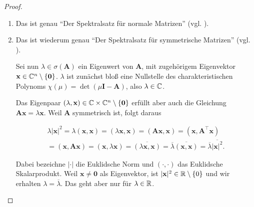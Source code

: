            \begin{proof}

                \phantom{}

                \begin{enumerate}[
                    label = \texttt{ad} \arabic*.,
                    wide,
                    labelindent = 0pt
                ]

                    \item Das ist genau \enquote{Der Spektralsatz für normale Matrizen} (vgl. \cite[Kapitel 17.7]{brokate2015grundwissen}).

                    \item Das ist wiederum genau \enquote{Der Spektralsatz für symmetrische Matrizen} (vgl. \cite[Kapitel 17.7]{brokate2015grundwissen}).

                    Sei nun $\lambda \in \sigma(\mathbf A)$ ein Eigenwert von $\mathbf A$, mit zugehörigem Eigenvektor $\mathbf x \in \mathbb C^n \setminus {\left \{ \mathbf 0 \right \}}$.
                    $\lambda$ ist zunächst bloß eine Nullstelle des charakteristischen Polynoms $\chi(\mu) = \det(\mu \mathbf I - \mathbf A)$, also $\lambda \in \mathbb C$.

                    Das Eigenpaar $(\lambda, \mathbf x) \in \mathbb C \times \mathbb C^n \setminus {\left \{ \mathbf 0 \right \}}$ erfüllt aber auch die Gleichung $\mathbf A \mathbf x = \lambda \mathbf x$.
                    Weil $\mathbf A$ symmetrisch ist, folgt daraus

                    \begin{multline*}
                        \lambda |\mathbf x|^2
                        =
                        \lambda (\mathbf x, \mathbf x)
                        =
                        (\lambda \mathbf x, \mathbf x)
                        =
                        (\mathbf A \mathbf x, \mathbf x)
                        =
                        (\mathbf x, \mathbf A^\top \mathbf x) \\
                        =
                        (\mathbf x, \mathbf A \mathbf x)
                        =
                        (\mathbf x, \lambda \mathbf x)
                        =
                        \overline{(\lambda \mathbf x, \mathbf x)}
                        =
                        \overline \lambda \overline{(\mathbf x, \mathbf x)}
                        =
                        \overline \lambda \overline{|\mathbf x|^2}.
                    \end{multline*}

                    Dabei bezeichne $|\cdot|$ die Euklidsche Norm und $(\cdot, \cdot)$ das Euklidsche Skalarprodukt.
                    Weil $\mathbf x \neq \mathbf 0$ als Eigenvektor, ist $|\mathbf x|^2 \in \mathbb R \setminus {\left \{ 0 \right \}}$ und wir erhalten $\lambda = \overline \lambda$.
                    Das geht aber nur für $\lambda \in \mathbb R$.

                \end{enumerate}
            \end{proof}

